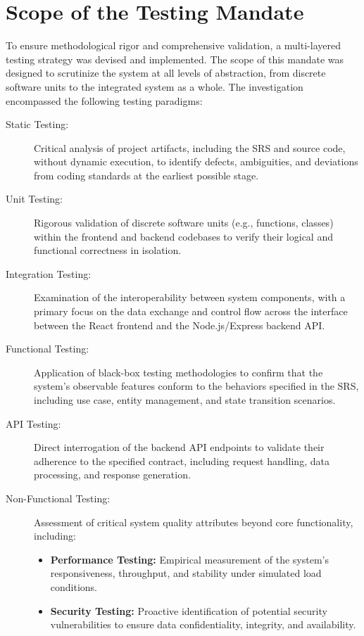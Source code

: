 \section{Scope of the Testing Mandate}
\label{sec:testing_scope}
To ensure methodological rigor and comprehensive validation, a multi-layered testing strategy was devised and implemented. The scope of this mandate was designed to scrutinize the system at all levels of abstraction, from discrete software units to the integrated system as a whole. The investigation encompassed the following testing paradigms:

\begin{description}
    \item[Static Testing:] Critical analysis of project artifacts, including the SRS and source code, without dynamic execution, to identify defects, ambiguities, and deviations from coding standards at the earliest possible stage.
    \item[Unit Testing:] Rigorous validation of discrete software units (e.g., functions, classes) within the frontend and backend codebases to verify their logical and functional correctness in isolation.
    \item[Integration Testing:] Examination of the interoperability between system components, with a primary focus on the data exchange and control flow across the interface between the React frontend and the Node.js/Express backend API.
    \item[Functional Testing:] Application of black-box testing methodologies to confirm that the system's observable features conform to the behaviors specified in the SRS, including use case, entity management, and state transition scenarios.
    \item[API Testing:] Direct interrogation of the backend API endpoints to validate their adherence to the specified contract, including request handling, data processing, and response generation.
    \item[Non-Functional Testing:] Assessment of critical system quality attributes beyond core functionality, including:
        \begin{itemize}
            \item \textbf{Performance Testing:} Empirical measurement of the system's responsiveness, throughput, and stability under simulated load conditions.
            \item \textbf{Security Testing:} Proactive identification of potential security vulnerabilities to ensure data confidentiality, integrity, and availability.

\end{itemize}
\end{description}
